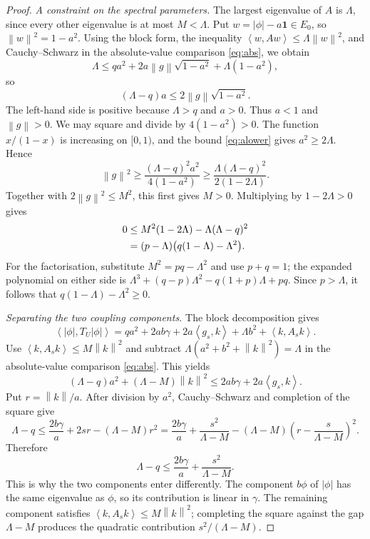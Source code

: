 \documentclass[11pt]{article}
\numberwithin{equation}{section}
\newcommand{\one}{\mathbf 1}
\newcommand{\norm}[1]{\left\lVert #1\right\rVert}
\newcommand{\ip}[2]{\left\langle #1,#2\right\rangle}
\begin{document}
\begin{proof}
\smallskip
\noindent\emph{A constraint on the spectral parameters.}
The largest eigenvalue of $A$ is $\Lambda$, since every other
eigenvalue is at most $M<\Lambda$. Put
$w=|\phi|-a\one\in E_0$, so $\norm w^2=1-a^2$.
Using the block form, the inequality
$\ip w{Aw}\le\Lambda\norm w^2$, and Cauchy--Schwarz in
the absolute-value comparison \eqref{eq:abs}, we obtain
\[
 \Lambda\le qa^2+2a\norm g\sqrt{1-a^2}+\Lambda(1-a^2),
\]
so
\[
 (\Lambda-q)a\le2\norm g\sqrt{1-a^2}.
\]
The left-hand side is positive because $\Lambda>q$ and $a>0$.
Thus $a<1$ and $\norm g>0$. We may square and divide by
$4(1-a^2)>0$. The function $x/(1-x)$ is increasing on $[0,1)$,
and the bound \eqref{eq:alower} gives $a^2\ge2\Lambda$. Hence
\[
 \norm g^2\ge\frac{(\Lambda-q)^2a^2}{4(1-a^2)}
 \ge\frac{\Lambda(\Lambda-q)^2}{2(1-2\Lambda)}.
\]
Together with $2\norm g^2\le M^2$, this first gives $M>0$.
Multiplying by $1-2\Lambda>0$ gives
\begin{align}\label{eq:admiss}
 0&\le M^2(1-2\Lambda)-\Lambda(\Lambda-q)^2\notag\\
  &=(p-\Lambda)\bigl(q(1-\Lambda)-\Lambda^2\bigr).
\end{align}
For the factorisation, substitute $M^2=pq-\Lambda^2$ and use
$p+q=1$; the expanded polynomial on either side is
$\Lambda^3+(q-p)\Lambda^2-q(1+p)\Lambda+pq$.
Since $p>\Lambda$, it follows that $q(1-\Lambda)-\Lambda^2\ge0$.

\smallskip
\noindent\emph{Separating the two coupling components.}
The block decomposition gives
\[
 \ip{|\phi|}{T_U|\phi|}
  =qa^2+2ab\gamma+2a\ip{g_s}{k}
       +\Lambda b^2+\ip k{A_s k}.
\]
Use $\ip k{A_s k}\le M\norm k^2$ and subtract
$\Lambda(a^2+b^2+\norm k^2)=\Lambda$ in the absolute-value
comparison \eqref{eq:abs}. This yields
\[
 (\Lambda-q)a^2+(\Lambda-M)\norm k^2
 \le2ab\gamma+2a\ip{g_s}{k}.
\]
Put $r=\norm k/a$. After division by $a^2$, Cauchy--Schwarz and
completion of the square give
\[
 \Lambda-q\le\frac{2b\gamma}{a}+2sr-(\Lambda-M)r^2
 =\frac{2b\gamma}{a}+\frac{s^2}{\Lambda-M}
   -(\Lambda-M)\left(r-\frac{s}{\Lambda-M}\right)^2.
\]
Therefore
\begin{equation}\label{eq:compintermediate}
 \Lambda-q\le\frac{2b\gamma}{a}+\frac{s^2}{\Lambda-M}.
\end{equation}
This is why the two components enter differently. The component
$b\phi$ of $|\phi|$ has the same eigenvalue as $\phi$, so its
contribution is linear in $\gamma$. The remaining component
satisfies $\ip k{A_s k}\le M\norm k^2$; completing the square
against the gap $\Lambda-M$ produces
the quadratic contribution $s^2/(\Lambda-M)$.


\end{proof}
\end{document}
